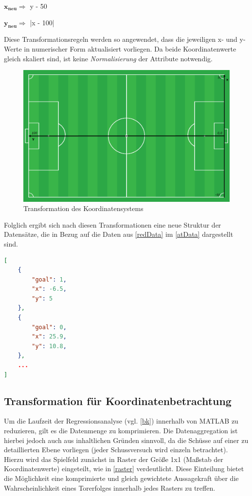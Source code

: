 \centerline{$\boldsymbol{x_{neu}} \Rightarrow$ y - 50 }
\centerline{$\boldsymbol{y_{neu}} \Rightarrow$ |x - 100|}

Diese Transformationsregeln werden so angewendet, dass die jeweiligen x- und y-Werte in numerischer Form aktualisiert vorliegen. Da beide Koordinatenwerte gleich skaliert sind, ist keine \textit{Normalisierung} der Attribute notwendig.

\begin{figure}[H]
\centering
\includegraphics[scale=0.27]{se-wa-jpg/transf_pitch}
\caption[Transformation des Koordinatensystems]{Transformation des Koordinatensystems}
\label{transf_pitch}
\end{figure}

\enlargethispage{2\baselineskip} Folglich ergibt sich nach diesen Transformationen eine neue Struktur der Datensätze, die in Bezug auf die Daten aus \vref{redData} im \vref{atData} dargestellt sind.\newline

\begin{lstlisting}[caption=\captionListingText,language=json,xleftmargin=5mm,label=atData] 
[
	{
		"goal": 1,
		"x": -6.5,
		"y": 5
	},
	{
		"goal": 0,
		"x": 25.9,
		"y": 10.8,
	},
	...
]
\end{lstlisting}

\subsection{Transformation für Koordinatenbetrachtung}
\label{kt}
Um die Laufzeit der Regressionsanalyse (vgl. \vref{bk}) innerhalb von MATLAB zu reduzieren, gilt es die Datenmenge zu komprimieren. Die Datenaggregation ist hierbei jedoch auch aus inhaltlichen Gründen sinnvoll, da die Schüsse auf einer zu detaillierten Ebene vorliegen (jeder Schussversuch wird einzeln betrachtet). Hierzu wird das Spielfeld zunächst in Raster der Größe \textsf{1x1} (Maßstab der Koordinatenwerte) eingeteilt, wie in \vref{raster} verdeutlicht. Diese Einteilung bietet die Möglichkeit eine komprimierte und gleich gewichtete Aussagekraft über die Wahrscheinlichkeit eines Torerfolges innerhalb jedes Rasters zu treffen.

